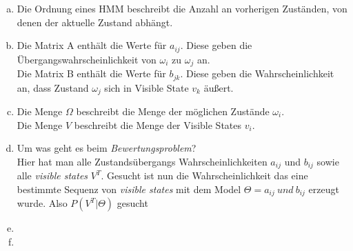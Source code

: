 \documentclass[a4paper]{scrartcl}
\begin{document}
\begin{enumerate}[(a)]
	\item Die Ordnung eines HMM beschreibt die Anzahl an vorherigen Zuständen, von denen der aktuelle Zustand abhängt.
	
	\item Die Matrix A enthält die Werte für $a_{ij}$. Diese geben die Übergangswahrscheinlichkeit von $\omega_i$ zu $\omega_j$ an.\\
	
	Die Matrix B enthält die Werte für $b_{jk}$. Diese geben die Wahrscheinlichkeit an, dass Zustand $\omega_j$ sich in Visible State $v_k$ äußert.\\
	
	\item Die Menge $\Omega$ beschreibt die Menge der möglichen Zustände $\omega_i$.\\
	
	Die Menge $V$ beschreibt die Menge der Visible States $v_i$.
	\item Um was geht es beim \textit{Bewertungsproblem}? \\
Hier hat man alle Zustandsübergangs Wahrscheinlichkeiten $a_{ij}$ und $b_{ij}$  sowie alle \textit{visible states} $V^T$. Gesucht ist nun die Wahrscheinlichkeit das eine bestimmte Sequenz von \textit{visible states} mit dem Model $\Theta =   a_{ij}\ und\ b_{ij}$ erzeugt wurde. Also $P(V^T|\Theta)$ gesucht
	\item 
	\item 
\end{enumerate}
\end{document}
